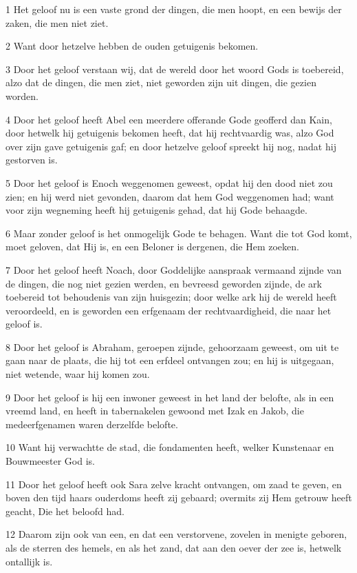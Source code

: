 \par 1 Het geloof nu is een vaste grond der dingen, die men hoopt, en een bewijs der zaken, die men niet ziet.
\par 2 Want door hetzelve hebben de ouden getuigenis bekomen.
\par 3 Door het geloof verstaan wij, dat de wereld door het woord Gods is toebereid, alzo dat de dingen, die men ziet, niet geworden zijn uit dingen, die gezien worden.
\par 4 Door het geloof heeft Abel een meerdere offerande Gode geofferd dan Kain, door hetwelk hij getuigenis bekomen heeft, dat hij rechtvaardig was, alzo God over zijn gave getuigenis gaf; en door hetzelve geloof spreekt hij nog, nadat hij gestorven is.
\par 5 Door het geloof is Enoch weggenomen geweest, opdat hij den dood niet zou zien; en hij werd niet gevonden, daarom dat hem God weggenomen had; want voor zijn wegneming heeft hij getuigenis gehad, dat hij Gode behaagde.
\par 6 Maar zonder geloof is het onmogelijk Gode te behagen. Want die tot God komt, moet geloven, dat Hij is, en een Beloner is dergenen, die Hem zoeken.
\par 7 Door het geloof heeft Noach, door Goddelijke aanspraak vermaand zijnde van de dingen, die nog niet gezien werden, en bevreesd geworden zijnde, de ark toebereid tot behoudenis van zijn huisgezin; door welke ark hij de wereld heeft veroordeeld, en is geworden een erfgenaam der rechtvaardigheid, die naar het geloof is.
\par 8 Door het geloof is Abraham, geroepen zijnde, gehoorzaam geweest, om uit te gaan naar de plaats, die hij tot een erfdeel ontvangen zou; en hij is uitgegaan, niet wetende, waar hij komen zou.
\par 9 Door het geloof is hij een inwoner geweest in het land der belofte, als in een vreemd land, en heeft in tabernakelen gewoond met Izak en Jakob, die medeerfgenamen waren derzelfde belofte.
\par 10 Want hij verwachtte de stad, die fondamenten heeft, welker Kunstenaar en Bouwmeester God is.
\par 11 Door het geloof heeft ook Sara zelve kracht ontvangen, om zaad te geven, en boven den tijd haars ouderdoms heeft zij gebaard; overmits zij Hem getrouw heeft geacht, Die het beloofd had.
\par 12 Daarom zijn ook van een, en dat een verstorvene, zovelen in menigte geboren, als de sterren des hemels, en als het zand, dat aan den oever der zee is, hetwelk ontallijk is.
